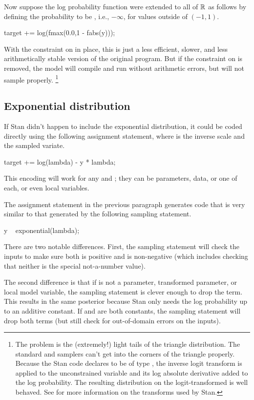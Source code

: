 Now suppose the log probability function were extended to all of
$\mathbb{R}$ as follows by defining the probability to be ,
i.e., $-\infty$, for values outside of $(-1,1)$.
%
\begin{stancode}
target += log(fmax(0.0,1 - fabs(y)));
\end{stancode}
%
With the constraint on  in place, this is just a less
efficient, slower, and less arithmetically stable version of the
original program.  But if the constraint on  is removed,
the model will compile and run without arithmetic errors, but will not
sample properly.%
%
\footnote{The problem is the (extremely!) light tails of the triangle
  distribution.  The standard \HMC and \NUTS samplers can't get into the
  corners of the triangle properly.  Because the Stan code declares
   to be of type , the inverse logit
  transform is applied to the unconstrained variable and its log
  absolute derivative added to the log probability.  The resulting
  distribution on the logit-transformed  is well behaved.  See
   for more information on the
  transforms used by Stan.}

\subsection{Exponential distribution}

If Stan didn't happen to include the exponential distribution, it
could be coded directly using the following assignment statement,
where  is the inverse scale and  the sampled
variate.
%
\begin{stancode}
target += log(lambda) - y * lambda;
\end{stancode}
%
This encoding will work for any  and ; they can
be parameters, data, or one of each, or even local variables.

The assignment statement in the previous paragraph generates
\Cpp code that is very similar to that generated by the following
sampling statement.
%
\begin{stancode}
y ~ exponential(lambda);
\end{stancode}
%
There are two notable differences.  First, the sampling statement will
check the inputs to make sure both  is positive and
 is non-negative (which includes checking that neither is the
special not-a-number value).

The second difference is that if  is not a parameter,
transformed parameter, or local model variable, the sampling statement
is clever enough to drop the  term.  This results in
the same posterior because Stan only needs the log probability up to
an additive constant.  If  and  are both
constants, the sampling statement will drop both terms (but still
check for out-of-domain errors on the inputs).

